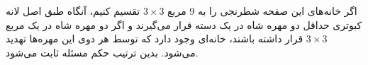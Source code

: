     \p
    اگر خانه‌های این صفحه شطرنجی را به 9 مربع
    $3\times3$
    تقسیم کنیم، آنگاه طبق اصل لانه کبوتری حداقل دو مهره شاه در یک دسته قرار می‌گیرند و اگر دو مهره شاه در یک مربع 
    $3\times3$
    قرار داشته باشند، خانه‌ای وجود دارد که توسط هر دوی این مهره‌ها تهدید می‌شود. بدین ترتیب حکم مسئله ثابت می‌شود.